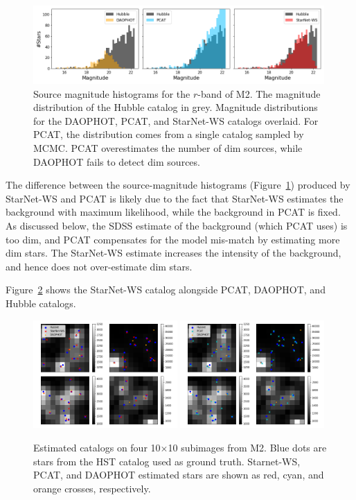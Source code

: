 \begin{figure}[ht]
    \centering
    \includegraphics[width=0.99\textwidth]{figures/luminosity_fun.png}
    \caption{Source magnitude histograms for the $r$-band of M2. 
    The magnitude distribution of the Hubble catalog in grey. 
    Magnitude distributions for the DAOPHOT, PCAT, and StarNet-WS catalogs overlaid.
    For PCAT, the distribution comes from a single catalog sampled by MCMC. 
    PCAT overestimates the number of dim sources, 
    while DAOPHOT fails to detect dim sources. }
    \label{fig:luminosity_fun_m2}
\end{figure}

The difference between the source-magnitude histograms  (Figure~\ref{fig:luminosity_fun_m2}) produced by StarNet-WS and PCAT
is likely due to the fact that StarNet-WS estimates the background with maximum likelihood, while the background in PCAT is fixed.
As discussed below, the SDSS estimate of the background (which PCAT uses) is too dim, and PCAT compensates for the model mis-match by estimating more dim stars. 
The StarNet-WS estimate increases the intensity of the background, and hence does not over-estimate dim stars. 

Figure~\ref{fig:example_subimages} shows the StarNet-WS catalog alongside PCAT, DAOPHOT, and Hubble catalogs. 

\begin{figure}[ht]
    \centering
    \includegraphics[width=0.49\textwidth]{figures/example_subimages_ws.png}
    \includegraphics[width=0.49\textwidth]{figures/example_subimages_pcat.png}
    \caption{Estimated catalogs on four 10$\times$10 subimages from
    M2. Blue dots are stars from the HST catalog used as ground truth. 
    Starnet-WS, PCAT, and DAOPHOT estimated stars are shown as
    red, cyan, and orange crosses, respectively. }
    \label{fig:example_subimages}
\end{figure}

